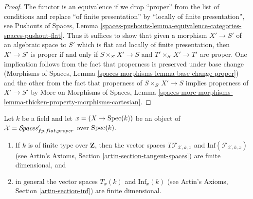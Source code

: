 \begin{proof}
The functor is an equivalence if we drop ``proper'' from the list
of conditions and replace ``of finite presentation'' by
``locally of finite presentation'', see Pushouts of Spaces, Lemma
\ref{spaces-pushouts-lemma-equivalence-categories-spaces-pushout-flat}.
Thus it suffices to show that given a morphism
$X' \to S'$ of an algebraic space to $S'$ which is
flat and locally of finite presentation, then
$X' \to S'$ is proper if and only if $S \times_{S'} X' \to S$
and $T' \times_{S'} X' \to T'$ are proper.
One implication follows from the fact that
properness is preserved under base change
(Morphisms of Spaces, Lemma \ref{spaces-morphisms-lemma-base-change-proper})
and the other from the fact that properness of $S \times_{S'} X' \to S$
implies properness of $X' \to S'$ by
More on Morphisms of Spaces, Lemma
\ref{spaces-more-morphisms-lemma-thicken-property-morphisms-cartesian}.
\end{proof}

\begin{lemma}
\label{lemma-spaces-tangent-space}
Let $k$ be a field and let $x = (X \to \mathop{\mathrm{Spec}}(k))$ be an object of
$\mathcal{X} = \mathcal{S}\!\mathit{paces}'_{fp, flat, proper}$ over $\mathop{\mathrm{Spec}}(k)$.
\begin{enumerate}
\item If $k$ is of finite type over $\mathbf{Z}$, then
the vector spaces $T\mathcal{F}_{\mathcal{X}, k, x}$ and
$\text{Inf}(\mathcal{F}_{\mathcal{X}, k, x})$
(see Artin's Axioms, Section \ref{artin-section-tangent-spaces})
are finite dimensional, and
\item in general the vector spaces $T_x(k)$ and $\text{Inf}_x(k)$
(see Artin's Axioms, Section \ref{artin-section-inf})
are finite dimensional.
\end{enumerate}
\end{lemma}

